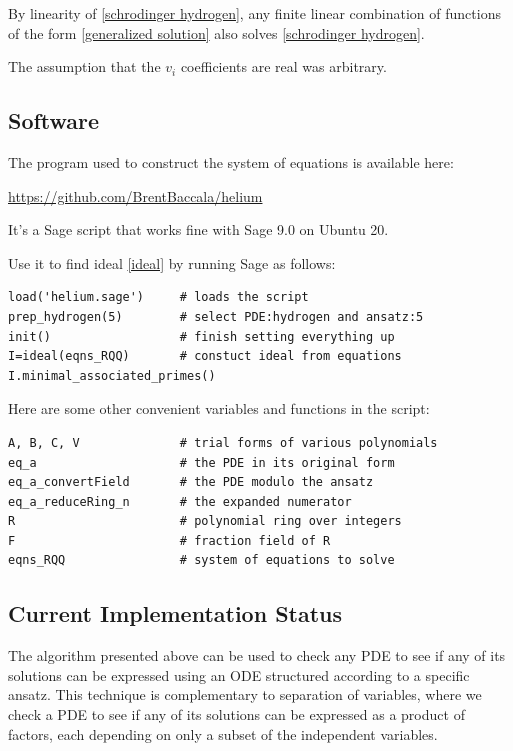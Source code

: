 \documentclass{article}
\begin{document}
By linearity of \eqref{schrodinger hydrogen}, any finite linear combination of functions of the form
\eqref{generalized solution} also solves \eqref{schrodinger hydrogen}.

The assumption that the $v_i$ coefficients are real was arbitrary.

\subsection*{Software}

The program used to construct the system of equations is available here:

\centerline{\url{https://github.com/BrentBaccala/helium}}

It's a Sage script that works fine with Sage 9.0 on Ubuntu 20.

Use it to find ideal \eqref{ideal} by
running Sage as follows:

\begin{verbatim}
load('helium.sage')     # loads the script
prep_hydrogen(5)        # select PDE:hydrogen and ansatz:5
init()                  # finish setting everything up
I=ideal(eqns_RQQ)       # constuct ideal from equations
I.minimal_associated_primes()
\end{verbatim}

Here are some other convenient variables and functions in the script:

\begin{verbatim}
A, B, C, V              # trial forms of various polynomials
eq_a                    # the PDE in its original form
eq_a_convertField       # the PDE modulo the ansatz
eq_a_reduceRing_n       # the expanded numerator
R                       # polynomial ring over integers
F                       # fraction field of R
eqns_RQQ                # system of equations to solve
\end{verbatim}

\subsection*{Current Implementation Status}

The algorithm presented above can be used to check any PDE to see if any of its solutions
can be expressed using an ODE structured according to a specific ansatz.  This technique
is complementary to separation of variables, where we check a PDE to see if any of
its solutions can be expressed as a product of factors, each depending on only
a subset of the independent variables.
\end{document}
